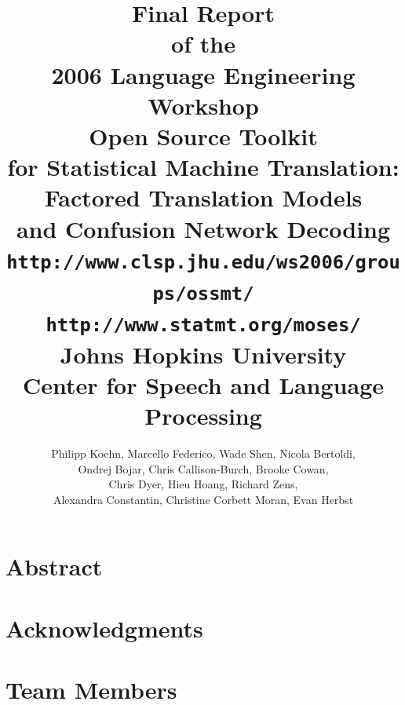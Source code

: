 \documentclass[11pt]{book}
\theoremstyle{plain}
\begin{document}
\title{\vspace{-25mm}\LARGE {\bf Final Report}\\[2mm]
of the\\[2mm]
2006 Language Engineering Workshop\\[15mm]
{\huge \bf Open Source Toolkit\\[2mm]
\bf for Statistical Machine Translation:\\[5mm]
Factored Translation Models\\[2mm]
and Confusion Network Decoding}\\[10mm]
{\tt \Large http://www.clsp.jhu.edu/ws2006/groups/ossmt/}\\[2mm]
{\tt \Large http://www.statmt.org/moses/}\\[15mm]
Johns Hopkins University\\[2mm]
Center for Speech and Language Processing}
\author{\large Philipp Koehn,
Marcello Federico,
Wade Shen,
Nicola Bertoldi,\\
\large Ondrej Bojar,
Chris Callison-Burch,
Brooke Cowan,\\
\large Chris Dyer,
Hieu Hoang,
Richard Zens,\\
\large Alexandra Constantin,
Christine Corbett Moran,
Evan Herbst}

\maketitle

\section*{Abstract}

\newpage
\section*{Acknowledgments}

\newpage
\section*{Team Members}
\end{document}
